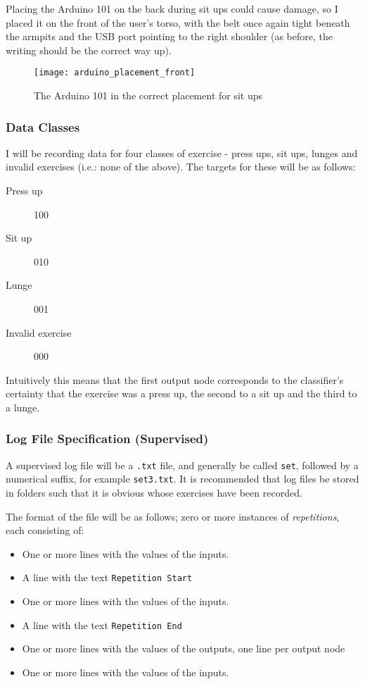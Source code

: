 \documentclass[a4paper]{article}
\begin{document}
Placing the Arduino 101 on the back during sit ups could cause damage, so I placed it on the front of the user's torso, with the belt once again tight beneath the armpits and the USB port pointing to the right shoulder (as before, the writing should be the correct way up).

\begin{figure}[H]
    \centering
        \texttt{[image: arduino\_placement\_front]}
        \caption{The Arduino 101 in the correct placement for sit ups}
        \label{fig:ar_placement_front}
\end{figure}

\subsubsection{Data Classes}
\label{subsubsec:dc_dc_classes}

I will be recording data for four classes of exercise - press ups, sit ups, lunges and invalid exercises (i.e.: none of the above). The targets for these will be as follows:

\begin{description}
\item[Press up] 100
\item[Sit up] 010
\item[Lunge] 001
\item[Invalid exercise] 000
\end{description}

Intuitively this means that the first output node corresponds to the classifier's certainty that the exercise was a press up, the second to a sit up and the third to a lunge. 

\subsubsection{Log File Specification (Supervised)}

A supervised log file will be a \lstinline{.txt} file, and generally be called \lstinline{set}, followed by a numerical suffix, for example \lstinline{set3.txt}. It is recommended that log files be stored in folders such that it is obvious whose exercises have been recorded.

The format of the file will be as follows; zero or more instances of \emph{repetitions}, each consisting of:

\begin{itemize}
\item One or more lines with the values of the inputs.
\item A line with the text \lstinline{Repetition Start}
\item One or more lines with the values of the inputs.
\item A line with the text \lstinline{Repetition End}
\item One or more lines with the values of the outputs, one line per output node
\item One or more lines with the values of the inputs.
\end{itemize}
\end{document}
